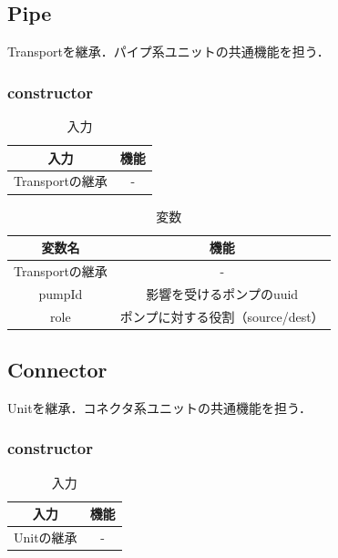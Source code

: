 \documentclass[uplatex,dvipdfmx,report]{jlreq}
\begin{document}
\subsection{Pipe}

Transportを継承．パイプ系ユニットの共通機能を担う．

\subsubsection{constructor}

\begin{table}[H]
    \centering
    \caption{入力}
    \begin{tabular}{cc}
        \hline
        入力 & 機能 \\
        \hline
        \hline
        Transportの継承 & - \\
        \hline
    \end{tabular}
\end{table}

\begin{table}[H]
    \centering
    \caption{変数}
    \begin{tabular}{cc}
        \hline
        変数名 & 機能 \\
        \hline
        \hline
        Transportの継承 & - \\
        pumpId & 影響を受けるポンプのuuid \\
        role & ポンプに対する役割（source/dest） \\
        \hline
    \end{tabular}
\end{table}

\subsection{Connector}

Unitを継承．コネクタ系ユニットの共通機能を担う．

\subsubsection{constructor}

\begin{table}[H]
    \centering
    \caption{入力}
    \begin{tabular}{cc}
        \hline
        入力 & 機能 \\
        \hline
        \hline
        Unitの継承 & - \\
        \hline
    \end{tabular}
\end{table}
\end{document}
